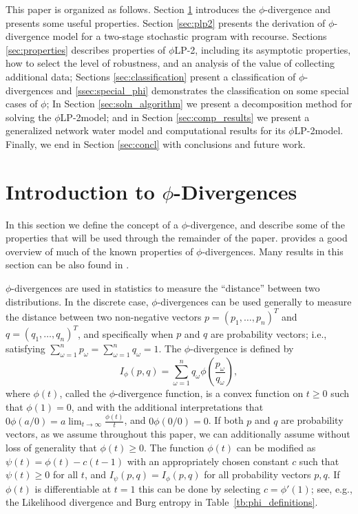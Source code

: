 \documentclass[ijoc,letterpaper]{informs3} %
\newcommand{\plp}{$\phi$LP-2}
\begin{document}
This paper is organized as follows.
Section \ref{sec:phi_divergences} introduces the $\phi$-divergence and presents some useful properties.
Section \ref{sec:plp2} presents the derivation of $\phi$-divergence model for a two-stage stochastic program with recourse.
Sections \ref{sec:properties} describes properties of \plp, including its asymptotic properties, how to select the level of robustness, and an analysis of the value of collecting additional data;
Sections \ref{sec:classification} present a classification of $\phi$-divergences and \ref{ssec:special_phi} demonstrates the classification on some special cases of $\phi$; 
In Section \ref{sec:soln_algorithm} we present a decomposition method for solving the \plp model; and in Section \ref{sec:comp_results} we present a generalized network water model and computational results for its \plp model.
Finally, we end in Section \ref{sec:concl} with conclusions and future work.

\section{Introduction to $\phi$-Divergences}
\label{sec:phi_divergences}

In this section we define the concept of a $\phi$-divergence, and describe some of the properties that will be used through the remainder of the paper.
\cite{pardo2005statistical} provides a good overview of much of the known properties of $\phi$-divergences.
Many results in this section can be also found in \citep{bental2011robust}.

$\phi$-divergences are used in statistics to measure the ``distance'' between two distributions. 
In the discrete case, $\phi$-divergences can be used generally to measure the distance between two non-negative vectors $p = (p_1, \dots, p_n)^T$ and $q = (q_1, \dots, q_n)^T$, and specifically when $p$ and $q$ are probability vectors; i.e., satisfying $\sum_{\omega=1}^n p_\omega = \sum_{\omega=1}^n q_\omega = 1$.
The $\phi$-divergence is defined by
\[
	I_\phi(p,q) = \sum_{\omega=1}^n q_\omega \phi\left(\frac{p_\omega}{q_\omega}\right),
\]
where $\phi(t)$, called the $\phi$-divergence function, is a convex function on $t \geq 0$ such that $\phi(1) = 0$, and with the additional interpretations that $0 \phi(a/0) = a \lim_{t \rightarrow \infty} \frac{\phi(t)}{t}$, and $0 \phi(0/0) = 0$.
If both $p$ and $q$ are probability vectors, as we assume throughout this paper, we can additionally assume without loss of generality that $\phi(t) \geq 0$.
The function $\phi(t)$ can be modified as $\psi(t) = \phi(t) - c(t-1)$ with an appropriately chosen constant $c$ such that $\psi(t) \geq 0$ for all $t$, and $I_\psi(p,q) = I_\phi(p,q)$ for all probability vectors $p,q$.
If $\phi(t)$ is differentiable at $t = 1$ this can be done by selecting $c = \phi'(1)$; see, e.g., the Likelihood divergence and Burg entropy in Table~\ref{tb:phi_definitions}.
\end{document}
